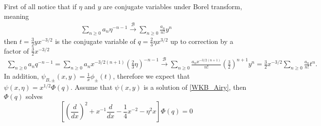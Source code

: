 \documentclass{article}
\begin{document}
First of all notice that if $\eta$ and $y$ are conjugate variables under Borel transform, meaning 
\begin{align*}
\sum_{n\geq 0}a_n\eta^{-n-1}  \overset{\mathcal{B}}{\longrightarrow} \sum_{n\geq 0}\frac{a_n}{n!} y^{n} 
\end{align*} 
then $t=\frac{3}{2}yx^{-3/2}$ is the conjugate variable of $q=\frac{2}{3}\eta x^{3/2}$ up to correction by a factor of $\frac{3}{2}x^{-3/2}$
\begin{align*}
\sum_{n\geq 0}a_nq^{-n-1}=\sum_{n\geq 0}a_nx^{-3/2(n+1)}\left(\frac{2}{3}\eta\right)^{-n-1}  \overset{\mathcal{B}}{\longrightarrow} \sum_{n\geq 0}\frac{a_nx^{-3/2(n+1)}}{n!}\left(\frac{3}{2}\right)^{n+1}  y^{n}=\frac{3}{2}x^{-3/2}\sum_{n\geq 0}\frac{a_n}{n!} t^{n}. 
\end{align*}
In addition, $\psi_{B,\pm}(x,y)=\frac{1}{x}\phi_{\pm}(t)$, therefore we expect that $\psi(x,\eta)=x^{1/2}\Phi(q)$. Assume that $\psi(x,y)$ is a solution of \eqref{WKB_Airy}, then $\Phi(q)$ solves 
\begin{equation}
\label{eq_Phi}
\left[\left(\frac{d}{dx}\right)^2+x^{-1}\frac{d}{dx}-\frac{1}{4}x^{-2} - \eta^2 x \right] \Phi(q) = 0
\end{equation}
\end{document}
